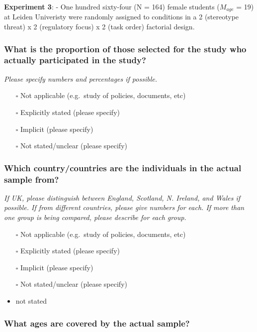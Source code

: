 \documentclass[
  doc, a4paper]{apa7}
\providecommand{\tightlist}{%
  \setlength{\itemsep}{0pt}\setlength{\parskip}{0pt}}
\begin{document}
\textbf{Experiment 3}:
- One hundred sixty-four (N = 164) female students (\(M_{age}\) = 19) at Leiden Univeristy were randomly assigned to conditions in a 2 (stereotype threat) x 2 (regulatory focus) x 2 (task order) factorial design.

\subsubsection{What is the proportion of those selected for the study who actually participated in the study?}\label{what-is-the-proportion-of-those-selected-for-the-study-who-actually-participated-in-the-study}

\emph{Please specify numbers and percentages if possible.}

\begin{itemize}
\tightlist
\item[$\square$]
  Not applicable (e.g.~study of policies, documents, etc)
\item[$\square$]
  Explicitly stated (please specify)
\item[$\square$]
  Implicit (please specify)
\item[$\square$]
  Not stated/unclear (please specify)
\end{itemize}

\subsubsection{Which country/countries are the individuals in the actual sample from?}\label{which-countrycountries-are-the-individuals-in-the-actual-sample-from}

\emph{If UK, please distinguish between England, Scotland, N. Ireland, and Wales if possible. If from different countries, please give numbers for each. If more than one group is being compared, please describe for each group.}

\begin{itemize}
\item[$\square$]
  Not applicable (e.g.~study of policies, documents, etc)
\item[$\square$]
  Explicitly stated (please specify)
\item[$\square$]
  Implicit (please specify)
\item[$\square$]
  Not stated/unclear (please specify)
\item
  not stated
\end{itemize}

\subsubsection{What ages are covered by the actual sample?}\label{what-ages-are-covered-by-the-actual-sample}
\end{document}
